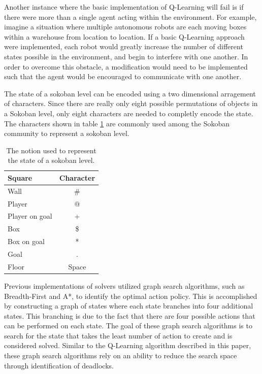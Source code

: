 \documentclass[times, 10pt,twocolumn]{article}
\begin{document}
Another instance where the basic implementation of Q-Learning will fail is if there were more than a single agent acting within the environment. For example, imagine a situation where multiple autonomous robots are each moving boxes within a warehouse from location to location. If a basic Q-Learning approach were implemented, each robot would greatly increase the number of different states possible in the environment, and begin to interfere with one another.  In order to overcome this obstacle, a modification would need to be implemented such that the agent would be encouraged to communicate with one another.


The state of a sokoban level can be encoded using a two dimensional arragement of characters. Since there are really only eight possible permutations of objects in a Sokoban level, only eight characters are needed to completly encode the state. The characters shown in table \ref{table:notation} are commonly used among the Sokoban community to represent a sokoban level.

\begin{table}[htbp]
  \centering
  \begin{tabular}{l c} \hline\hline
    Square & Character \\ \hline
    Wall & \# \\
    Player & @ \\
    Player on goal & + \\
    Box & \$ \\
    Box on goal & * \\
    Goal & . \\
    Floor & Space \\ \hline\hline
  \end{tabular}
  \caption{The notion used to represent the state of a sokoban level.}
  \label{table:notation}
\end{table}


Previous implementations of solvers utilized graph search algorithms, such as Breadth-First and A*, to identify the optimal action policy. This is accomplished by constructing a graph of states where each state branches into four additional states. This branching is due to the fact that there are four possible actions that can be performed on each state. The goal of these graph search algorithms is to search for the state that takes the least number of action to create and is considered solved. Similar to the Q-Learning algorithm described in this paper, these graph search algorithms rely on an ability to reduce the search space through identification of deadlocks.
\end{document}
